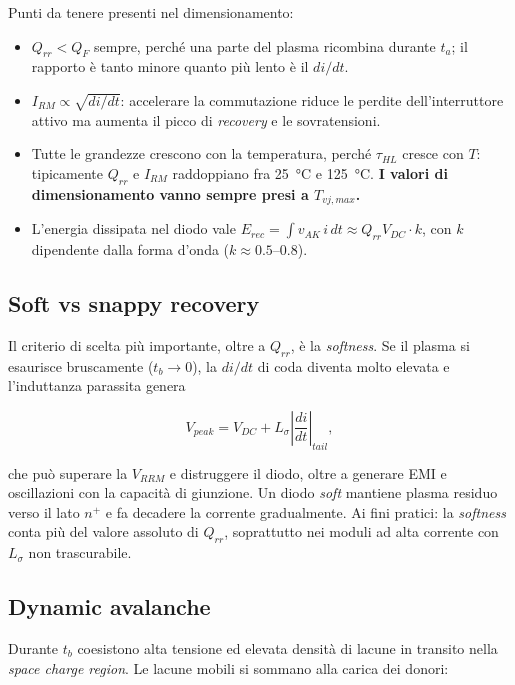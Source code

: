 \documentclass[11pt,a4paper]{article}
\begin{document}
Punti da tenere presenti nel dimensionamento:

\begin{itemize}
\item $Q_{rr} < Q_F$ sempre, perché una parte del plasma ricombina durante
$t_a$; il rapporto è tanto minore quanto più lento è il $di/dt$.
\item $I_{RM} \propto \sqrt{di/dt}$: accelerare la commutazione riduce le
perdite dell'interruttore attivo ma aumenta il picco di \emph{recovery} e le
sovratensioni.
\item Tutte le grandezze crescono con la temperatura, perché $\tau_{HL}$ cresce
con $T$: tipicamente $Q_{rr}$ e $I_{RM}$ raddoppiano fra \SI{25}{\celsius} e
\SI{125}{\celsius}. \textbf{I valori di dimensionamento vanno sempre presi a
$T_{vj,max}$.}
\item L'energia dissipata nel diodo vale
$E_{rec} = \int v_{AK}\, i\, dt \approx Q_{rr} V_{DC} \cdot k$, con $k$ dipendente
dalla forma d'onda ($k \approx 0.5$--$0.8$).
\end{itemize}

\subsection{Soft vs snappy recovery}

Il criterio di scelta più importante, oltre a $Q_{rr}$, è la \emph{softness}. Se
il plasma si esaurisce bruscamente ($t_b \to 0$), la $di/dt$ di coda diventa
molto elevata e l'induttanza parassita genera

\begin{equation}
V_{peak} = V_{DC} + L_{\sigma} \left|\frac{di}{dt}\right|_{tail},
\end{equation}

che può superare la $V_{RRM}$ e distruggere il diodo, oltre a generare EMI e
oscillazioni con la capacità di giunzione. Un diodo \emph{soft} mantiene
plasma residuo verso il lato $n^{+}$ e fa decadere la corrente gradualmente.
Ai fini pratici: la \emph{softness} conta più del valore assoluto di $Q_{rr}$,
soprattutto nei moduli ad alta corrente con $L_\sigma$ non trascurabile.

\subsection{Dynamic avalanche}

Durante $t_b$ coesistono alta tensione ed elevata densità di lacune in transito
nella \emph{space charge region}. Le lacune mobili si sommano alla carica dei
donori:
\end{document}

